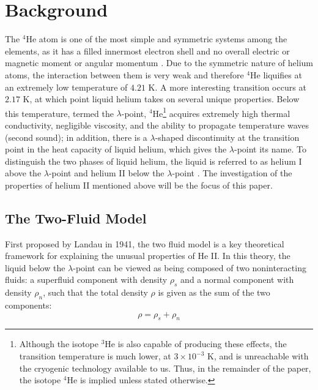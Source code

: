 
\section{Background}\label{background}

The $^4$He atom is one of the most simple and symmetric systems
among the elements, as it has a filled innermost electron shell and no
overall electric or magnetic moment or angular momentum
\cite{atkins}. Due to the symmetric nature of helium atoms, the
interaction between them is very weak and therefore $^4$He liquifies
at an extremely low temperature of $4.21$ K. A more
interesting transition occurs at $2.17$ K, at which point liquid
helium takes on several unique properties. Below this temperature,
termed the $\lambda$-point, $^4$He\footnote{Although the isotope
  $^3$He is also capable of producing these effects, the transition
  temperature is much lower, at $3\times 10^{-3}$ K, and is
  unreachable with the cryogenic technology available to us. Thus, in
  the remainder of the paper, the isotope $^4$He is implied unless
  stated otherwise.}  acquires extremely high thermal conductivity,
negligible viscosity, and the ability to propagate temperature waves
(second sound); in addition, there is a $\lambda$-shaped discontinuity
at the transition point in the heat capacity of liquid helium, which
gives the $\lambda$-point its name. To distinguish the two phases of
liquid helium, the liquid is referred to as helium I above the
$\lambda$-point and helium II below the $\lambda$-point
\cite{tilley}. The investigation of the properties of helium II
mentioned above will be the focus of this paper.

\subsection{The Two-Fluid Model}\label{thetwofluidmodel}

First proposed by Landau in 1941\cite{landau}, the two fluid model 
is a key theoretical framework for explaining the
unusual properties of He II. In this theory, the liquid below the $\lambda$-point
can be viewed as being composed of two noninteracting fluids: a
superfluid component with density $\rho_s$ and a normal component with
density $\rho_n$, such that the total density $\rho$ is given as the
sum of the two components:
\begin{equation}
\rho = \rho_s + \rho_n
\label{eqn:density}
\end{equation}

